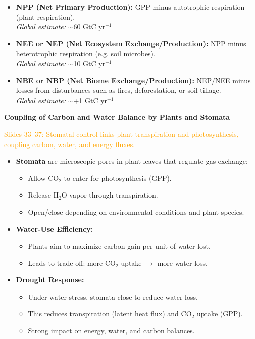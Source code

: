 \documentclass[fontsize=8pt, a4paper, landscape, fleqn]{scrartcl}
\renewcommand{\subsection}[1]{%
    \noindent\colorbox{subsectioncolor}{%
        \parbox{\dimexpr\columnwidth-2\fboxsep}{\color{white}\textbf{#1}}}%
    \vspace{0.5mm}%
}
\begin{document}
\begin{multicols*}{3}[\raggedcolumns]
\begin{itemize}
    \item \textbf{NPP (Net Primary Production):} GPP minus autotrophic respiration (plant respiration). \\
    \textit{Global estimate:} $\sim$60 GtC yr$^{-1}$
    
    \item \textbf{NEE or NEP (Net Ecosystem Exchange/Production):} NPP minus heterotrophic respiration (e.g. soil microbes). \\
    \textit{Global estimate:} $\sim$10 GtC yr$^{-1}$
    
    \item \textbf{NBE or NBP (Net Biome Exchange/Production):} NEP/NEE minus losses from disturbances such as fires, deforestation, or soil tillage. \\
    \textit{Global estimate:} $\sim$+1 GtC yr$^{-1}$
\end{itemize}

\subsection{Coupling of Carbon and Water Balance by Plants and Stomata}
\noindent \textcolor{orange}{Slides 33–37: Stomatal control links plant transpiration and photosynthesis, coupling carbon, water, and energy fluxes.}

\begin{itemize}
    \item \textbf{Stomata} are microscopic pores in plant leaves that regulate gas exchange:
    \begin{itemize}
        \item Allow CO$_2$ to enter for photosynthesis (GPP).
        \item Release H$_2$O vapor through transpiration.
        \item Open/close depending on environmental conditions and plant species.
    \end{itemize}

    \item \textbf{Water-Use Efficiency:}
    \begin{itemize}
        \item Plants aim to maximize carbon gain per unit of water lost.
        \item Leads to trade-off: more CO$_2$ uptake $\rightarrow$ more water loss.
    \end{itemize}
    
    \item \textbf{Drought Response:}
    \begin{itemize}
        \item Under water stress, stomata close to reduce water loss.
        \item This reduces transpiration (latent heat flux) and CO$_2$ uptake (GPP).
        \item Strong impact on energy, water, and carbon balances.
    \end{itemize}


\end{itemize}
\end{multicols*}
\end{document}
